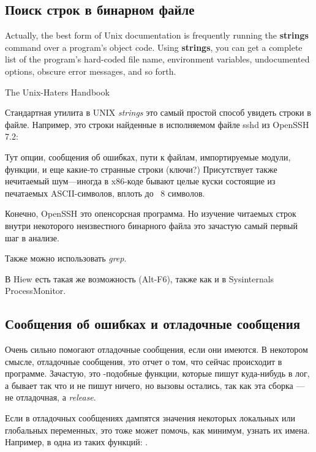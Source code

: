 \label{sec:digging_strings}



\subsection{Поиск строк в бинарном файле}

\epigraph{Actually, the best form of Unix documentation is frequently running the
\textbf{strings} command over a program’s object code. Using \textbf{strings}, you can get
a complete list of the program’s hard-coded file name, environment variables,
undocumented options, obscure error messages, and so forth.}{The Unix-Haters Handbook}

Стандартная утилита в UNIX \emph{strings} это самый простой способ увидеть строки в файле.
Например, это строки найденные в исполняемом файле sshd из OpenSSH 7.2:



Тут опции, сообщения об ошибках, пути к файлам, импортируемые модули, функции, и еще какие-то странные строки (ключи?)
Присутствует также нечитаемый шум---иногда в x86-коде бывают целые куски состоящие из печатаемых ASCII-символов,
вплоть до ~8 символов.

Конечно, OpenSSH это опенсорсная программа.
Но изучение читаемых строк внутри некоторого неизвестного бинарного файла это зачастую самый первый шаг в анализе.

Также можно использовать \emph{grep}.

В Hiew есть такая же возможность (Alt-F6), также как и в Sysinternals ProcessMonitor.

\subsection{Сообщения об ошибках и отладочные сообщения}

Очень сильно помогают отладочные сообщения, если они имеются. В некотором смысле, отладочные сообщения, 
это отчет о том, что сейчас происходит в программе.
Зачастую, это \printf-подобные функции, 
которые пишут куда-нибудь в лог, а бывает так что и не пишут ничего, но вызовы остались, так как эта сборка --- не
отладочная, а \emph{release}.

\myindex{\oracle}
Если в отладочных сообщениях дампятся значения некоторых локальных или глобальных переменных, 
это тоже может помочь, как минимум, узнать их имена. 
Например, в \oracle одна из таких функций: .

